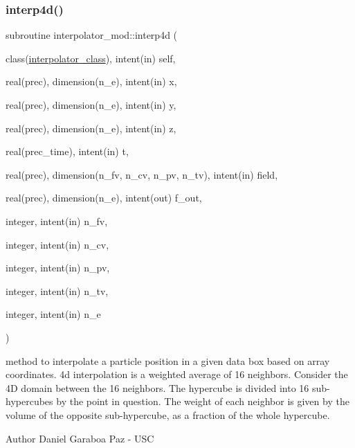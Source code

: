 \subsubsection{\texorpdfstring{interp4d()}{interp4d()}}
{\footnotesize\ttfamily subroutine interpolator\+\_\+mod\+::interp4d (\begin{DoxyParamCaption}\item[{class(\mbox{\hyperlink{structinterpolator__mod_1_1interpolator__class}{interpolator\+\_\+class}}), intent(in)}]{self,  }\item[{real(prec), dimension(n\+\_\+e), intent(in)}]{x,  }\item[{real(prec), dimension(n\+\_\+e), intent(in)}]{y,  }\item[{real(prec), dimension(n\+\_\+e), intent(in)}]{z,  }\item[{real(prec\+\_\+time), intent(in)}]{t,  }\item[{real(prec), dimension(n\+\_\+fv, n\+\_\+cv, n\+\_\+pv, n\+\_\+tv), intent(in)}]{field,  }\item[{real(prec), dimension(n\+\_\+e), intent(out)}]{f\+\_\+out,  }\item[{integer, intent(in)}]{n\+\_\+fv,  }\item[{integer, intent(in)}]{n\+\_\+cv,  }\item[{integer, intent(in)}]{n\+\_\+pv,  }\item[{integer, intent(in)}]{n\+\_\+tv,  }\item[{integer, intent(in)}]{n\+\_\+e }\end{DoxyParamCaption})\hspace{0.3cm}{\ttfamily [private]}}



method to interpolate a particle position in a given data box based on array coordinates. 4d interpolation is a weighted average of 16 neighbors. Consider the 4D domain between the 16 neighbors. The hypercube is divided into 16 sub-\/hypercubes by the point in question. The weight of each neighbor is given by the volume of the opposite sub-\/hypercube, as a fraction of the whole hypercube. 

\begin{DoxyAuthor}{Author}
Daniel Garaboa Paz -\/ U\+SC 
\end{DoxyAuthor}

